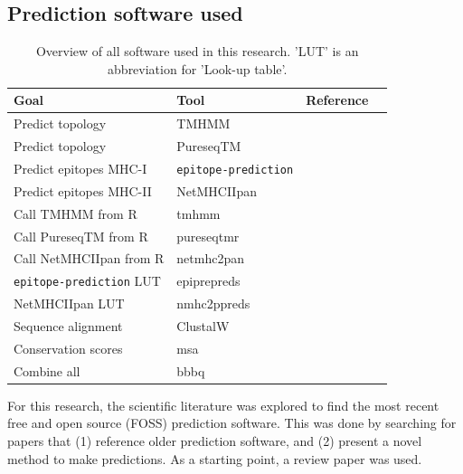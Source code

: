 \subsection{Prediction software used}
\label{subsec:prediction_software_used}

\begin{table}[]
  \begin{tabular}{llll}
    Goal & Tool & Reference \\ 
    \hline
    Predict topology                  & TMHMM                     & \cite{krogh2001predicting} \\
    Predict topology                  & PureseqTM                 & \cite{wang2019efficient} \\
    Predict epitopes MHC-I            & \verb;epitope-prediction; & \cite{bianchi2017} \\
    Predict epitopes MHC-II           & NetMHCIIpan               & \cite{nielsen2008quantitative,karosiene2013netmhciipan} \\
    Call TMHMM from R                 & tmhmm                     & \cite{tmhmm} \\
    Call PureseqTM from R             & pureseqtmr                & \cite{pureseqtmr} \\
    Call NetMHCIIpan from R           & netmhc2pan                & \cite{netmhc2pan} \\
    \verb;epitope-prediction; LUT     & epiprepreds               & \cite{epiprepreds} \\
    NetMHCIIpan LUT                   & nmhc2ppreds               & \cite{nmhc2ppreds} \\
    Sequence alignment                & ClustalW                  & \cite{thompson1994clustal} \\
    Conservation scores               & msa                       & \cite{bodenhofer2015msa} \\
    Combine all                       & bbbq                      & \cite{bbbq}
  \end{tabular}
  \caption{
    Overview of all software used in this research.
    'LUT' is an abbreviation for 'Look-up table'. 
  }
  \label{table:software_used}
\end{table}

For this research, the scientific literature was explored 
to find the most recent free and open source (FOSS) prediction software.
This was done by searching for papers that (1) reference older
prediction software, and (2) present a novel method to make predictions.
As a starting point, a review paper was used.


